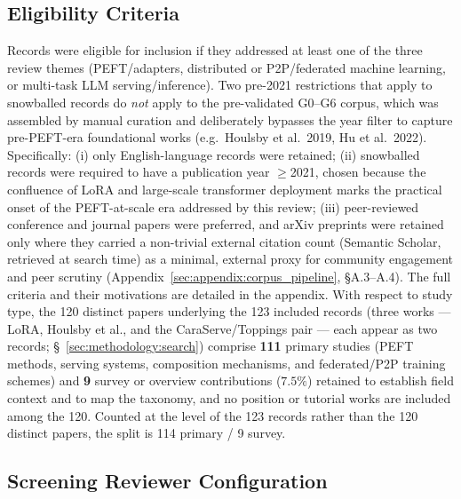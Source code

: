 \subsection{Eligibility Criteria}
\label{sec:methodology:eligibility}

Records were eligible for inclusion if they addressed at least one of the
three review themes (PEFT/adapters, distributed or P2P/federated machine
learning, or multi-task LLM serving/inference). Two pre-2021 restrictions
that apply to snowballed records do \emph{not} apply to the pre-validated
G0--G6 corpus, which was assembled by manual curation and deliberately
bypasses the year filter to capture pre-PEFT-era foundational works
(e.g.\ Houlsby et al.\ 2019, Hu et al.\ 2022). Specifically:
(i) only English-language records were retained;
(ii) snowballed records were required to have a publication year
$\geq$2021, chosen because the confluence of LoRA and large-scale transformer
deployment marks the practical onset of the PEFT-at-scale era addressed by
this review;
(iii) peer-reviewed conference and journal papers were preferred, and
arXiv preprints were retained only where they carried a non-trivial external
citation count (Semantic Scholar, retrieved at search time) as a minimal,
external proxy for community engagement and peer scrutiny
(Appendix~\ref{sec:appendix:corpus_pipeline}, \S A.3--A.4). The full criteria
and their motivations are detailed in the appendix. With respect to study type,
the 120 distinct papers underlying the 123 included records (three works ---
LoRA, Houlsby et al., and the CaraServe/Toppings pair --- each appear as two
records; \S~\ref{sec:methodology:search}) comprise \textbf{111} primary studies
(PEFT methods, serving systems, composition mechanisms, and federated/P2P
training schemes) and \textbf{9} survey or overview contributions ($7.5\%$)
retained to establish field context and to map the taxonomy, and no position or
tutorial works are included among the 120. Counted at the level of the 123
records rather than the 120 distinct papers, the split is 114 primary / 9
survey.

\subsection*{Screening Reviewer Configuration}
\label{sec:methodology:screening_reviewers}

